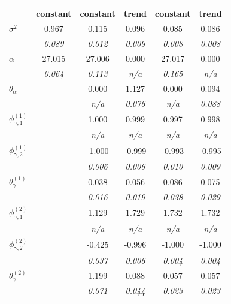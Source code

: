 \begin{table}[t!]
\centering
\footnotesize
\begin{tabular}{lccccc}
\toprule
 & constant & constant & trend & constant & trend \\
\midrule
$\sigma^2$ & 0.967 & 0.115 & 0.096 & 0.085 & 0.086 \\
 & {\footnotesize\textit{0.089}} & {\footnotesize\textit{0.012}} & {\footnotesize\textit{0.009}} & {\footnotesize\textit{0.008}} & {\footnotesize\textit{0.008}} \\
$\alpha$ & 27.015 & 27.006 & 0.000 & 27.017 & 0.000 \\
 & {\footnotesize\textit{0.064}} & {\footnotesize\textit{0.113}} & {\footnotesize\textit{n/a}} & {\footnotesize\textit{0.165}} & {\footnotesize\textit{n/a}} \\
$\theta_{\alpha}$ &  & 0.000 & 1.127 & 0.000 & 0.094 \\
 &  & {\footnotesize\textit{n/a}} & {\footnotesize\textit{0.076}} & {\footnotesize\textit{n/a}} & {\footnotesize\textit{0.088}} \\
$\phi_{\gamma,1}^{(1)}$ &  & 1.000 & 0.999 & 0.997 & 0.998 \\
 &  & {\footnotesize\textit{n/a}} & {\footnotesize\textit{n/a}} & {\footnotesize\textit{n/a}} & {\footnotesize\textit{n/a}} \\
$\phi_{\gamma,2}^{(1)}$ &  & -1.000 & -0.999 & -0.993 & -0.995 \\
 &  & {\footnotesize\textit{0.006}} & {\footnotesize\textit{0.006}} & {\footnotesize\textit{0.010}} & {\footnotesize\textit{0.009}} \\
$\theta_{\gamma}^{(1)}$ &  & 0.038 & 0.056 & 0.086 & 0.075 \\
 &  & {\footnotesize\textit{0.016}} & {\footnotesize\textit{0.019}} & {\footnotesize\textit{0.038}} & {\footnotesize\textit{0.029}} \\
$\phi_{\gamma,1}^{(2)}$ &  & 1.129 & 1.729 & 1.732 & 1.732 \\
 &  & {\footnotesize\textit{n/a}} & {\footnotesize\textit{n/a}} & {\footnotesize\textit{n/a}} & {\footnotesize\textit{n/a}} \\
$\phi_{\gamma,2}^{(2)}$ &  & -0.425 & -0.996 & -1.000 & -1.000 \\
 &  & {\footnotesize\textit{0.037}} & {\footnotesize\textit{0.006}} & {\footnotesize\textit{0.004}} & {\footnotesize\textit{0.004}} \\
$\theta_{\gamma}^{(2)}$ &  & 1.199 & 0.088 & 0.057 & 0.057 \\
 &  & {\footnotesize\textit{0.071}} & {\footnotesize\textit{0.044}} & {\footnotesize\textit{0.023}} & {\footnotesize\textit{0.023}} \\

\end{tabular}
\end{table}
